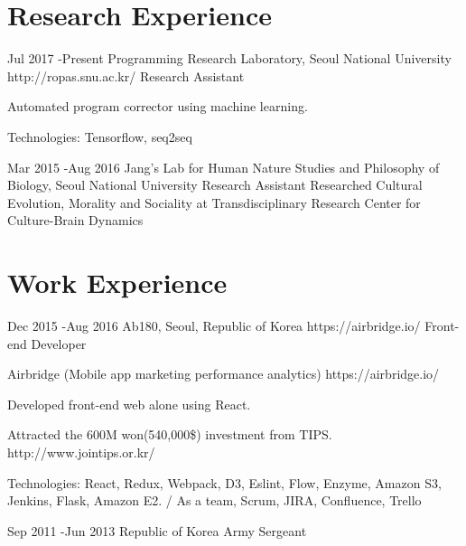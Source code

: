 \documentclass[10pt]{article} %
\begin{document}

\section{Research Experience}

\job
{Jul 2017 -}{Present}
{Programming Research Laboratory, Seoul National University}
{http://ropas.snu.ac.kr/}
{Research Assistant}
{Automated program corrector using machine learning.\\
\rule{0mm}{5mm}{Technologies:} Tensorflow, seq2seq}


\if{}
\job
{Mar 2015 -}{Aug 2016}
{Jang’s Lab for Human Nature Studies and Philosophy of Biology, Seoul National University}
{}
{Research Assistant}
{Researched Cultural Evolution, Morality and Sociality at Transdisciplinary Research Center for Culture-Brain Dynamics}
\fi


\section{Work Experience}

\job
{Dec 2015 -}{Aug 2016}
{Ab180, Seoul, Republic of Korea}
{https://airbridge.io/}
{Front-end Developer}
{Airbridge (Mobile app marketing performance analytics) https://airbridge.io/

Developed front-end web alone using React.

Attracted the 600M won(540,000\$) investment from TIPS. http://www.jointips.or.kr/\\
\rule{0mm}{5mm}{Technologies:} React, Redux, Webpack, D3, Eslint, Flow, Enzyme, Amazon S3, Jenkins, Flask, Amazon E2. / As a team, Scrum, JIRA, Confluence, Trello}


\if{}
\job
{Sep 2011 -}{Jun 2013}
{Republic of Korea Army}
{}
{Sergeant}
{}
\fi
\end{document}
